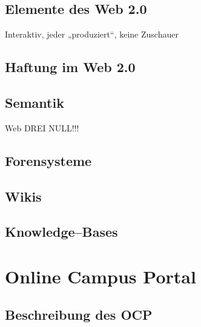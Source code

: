 \subsection{Elemente des Web 2.0} %
\label{sub:elemente_des_web_2_0}
Interaktiv, jeder „produziert“, keine Zuschauer

\subsection{Haftung im Web 2.0} %
\label{sub:haftung_im_web_2_0}


\subsection{Semantik} %
\label{sub:semantik}
Web DREI NULL!!!

\subsection{Forensysteme} %
\label{sub:forensysteme}


\subsection{Wikis} %
\label{sub:wikis}


\subsection{Knowledge--Bases} %
\label{sub:knowledge_bases}


\section{Online Campus Portal} %
\label{sec:online_campus_portal}

\subsection{Beschreibung des OCP} %
\label{sub:beschreibung_des_ocp}

